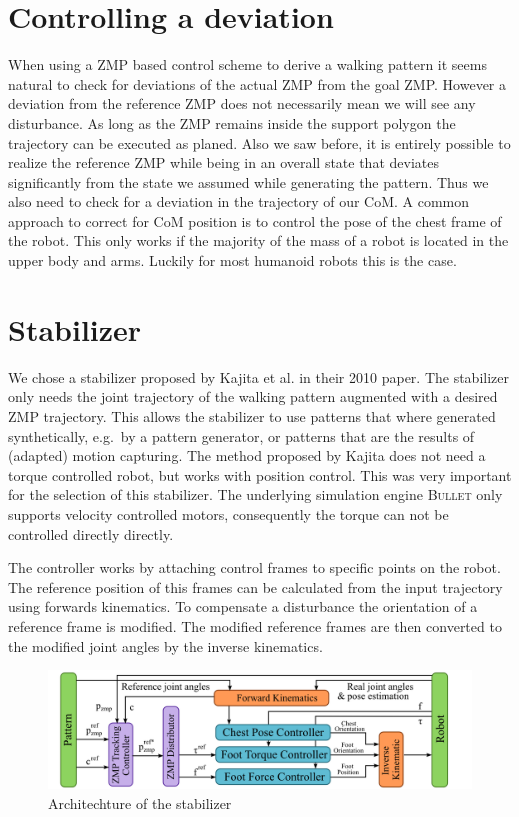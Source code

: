 \documentclass[english,ngerman]{KITreprt}
\newcommand{\name}[1]{\textsc{#1}}
\begin{document}
\section{Controlling a deviation}\label{controlling-a-deviation}

When using a ZMP based control scheme to derive a walking pattern it
seems natural to check for deviations of the actual ZMP from the goal
ZMP. However a deviation from the reference ZMP does not necessarily
mean we will see any disturbance. As long as the ZMP remains inside the
support polygon the trajectory can be executed as planed. Also we saw
before, it is entirely possible to realize the reference ZMP while being
in an overall state that deviates significantly from the state we
assumed while generating the pattern. Thus we also need to check for a
deviation in the trajectory of our CoM. A common approach to correct for
CoM position is to control the pose of the chest frame of the robot.
This only works if the majority of the mass of a robot is located in the
upper body and arms. Luckily for most humanoid robots this is the case.

\section{Stabilizer}\label{section:stabilizer}

We chose a stabilizer proposed by Kajita et al. in their 2010 paper.
\cite{kajita2010biped} The stabilizer only needs the joint trajectory of
the walking pattern augmented with a desired ZMP trajectory. This allows
the stabilizer to use patterns that where generated synthetically,
e.g.~by a pattern generator, or patterns that are the results of
(adapted) motion capturing. The method proposed by Kajita does not need
a torque controlled robot, but works with position control. This was
very important for the selection of this stabilizer. The underlying
simulation engine \name{Bullet} only supports velocity controlled
motors, consequently the torque can not be controlled directly directly.

The controller works by attaching control frames to specific points on
the robot. The reference position of this frames can be calculated from
the input trajectory using forwards kinematics. To compensate a
disturbance the orientation of a reference frame is modified. The
modified reference frames are then converted to the modified joint
angles by the inverse kinematics.

\begin{figure}[tb]
\vspace*{-1em}
\includegraphics[width=\textwidth]{images/stabilizer_architechture.png}
\caption{Architechture of the stabilizer}
\label{img:archtitechture-stabiluzer}
\end{figure}
\end{document}
